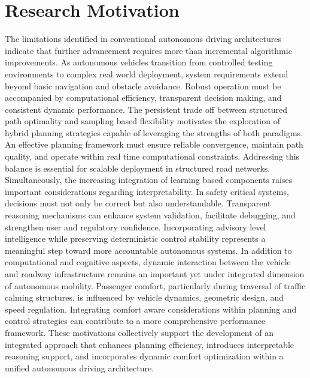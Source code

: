 \documentclass[a4paper,12pt,one side]{report}
\theoremstyle{definition}
\begin{document}
\section{Research Motivation}
The limitations identified in conventional autonomous driving architectures indicate that further advancement requires more than incremental algorithmic improvements. As autonomous vehicles transition from controlled testing environments to complex real world deployment, system requirements extend beyond basic navigation and obstacle avoidance. Robust operation must be accompanied by computational efficiency, transparent decision making, and consistent dynamic performance.
The persistent trade off between structured path optimality and sampling based flexibility motivates the exploration of hybrid planning strategies capable of leveraging the strengths of both paradigms. An effective planning framework must ensure reliable convergence, maintain path quality, and operate within real time computational constraints. Addressing this balance is essential for scalable deployment in structured road networks.
Simultaneously, the increasing integration of learning based components raises important considerations regarding interpretability. In safety critical systems, decisions must not only be correct but also understandable. Transparent reasoning mechanisms can enhance system validation, facilitate debugging, and strengthen user and regulatory confidence. Incorporating advisory level intelligence while preserving deterministic control stability represents a meaningful step toward more accountable autonomous systems.
In addition to computational and cognitive aspects, dynamic interaction between the vehicle and roadway infrastructure remains an important yet under integrated dimension of autonomous mobility. Passenger comfort, particularly during traversal of traffic calming structures, is influenced by vehicle dynamics, geometric design, and speed regulation. Integrating comfort aware considerations within planning and control strategies can contribute to a more comprehensive performance framework.
These motivations collectively support the development of an integrated approach that enhances planning efficiency, introduces interpretable reasoning support, and incorporates dynamic comfort optimization within a unified autonomous driving architecture.
\end{document}
